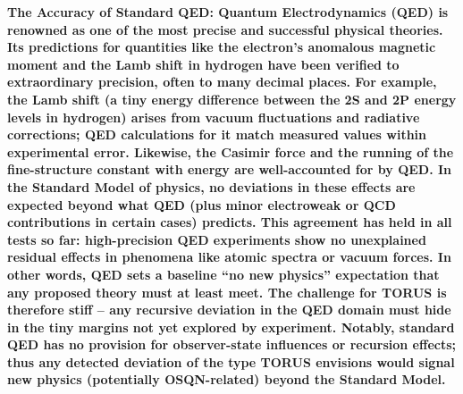 \documentclass[
]{article}
\begin{document}
\textbf{The Accuracy of Standard QED: Quantum Electrodynamics (QED) is
renowned as one of the most precise and successful physical theories.
Its predictions for quantities like the electron's anomalous magnetic
moment and the Lamb shift in hydrogen have been verified to
extraordinary precision, often to many decimal places. For example, the
Lamb shift (a tiny energy difference between the 2S and 2P energy levels
in hydrogen) arises from vacuum fluctuations and radiative corrections;
QED calculations for it match measured values within experimental error.
Likewise, the Casimir force and the running of the fine-structure
constant with energy are well-accounted for by QED. In the Standard
Model of physics, no deviations in these effects are expected beyond
what QED (plus minor electroweak or QCD contributions in certain cases)
predicts. This agreement has held in all tests so far: high-precision
QED experiments show no unexplained residual effects in phenomena like
atomic spectra or vacuum forces. In other words, QED sets a baseline
``no new physics'' expectation that any proposed theory must at least
meet. The challenge for TORUS is therefore stiff -- any recursive
deviation in the QED domain must hide in the tiny margins not yet
explored by experiment. Notably, standard QED has no provision for
observer-state influences or recursion effects; thus any detected
deviation of the type TORUS envisions would signal new physics
(potentially OSQN-related) beyond the Standard Model.}
\end{document}
